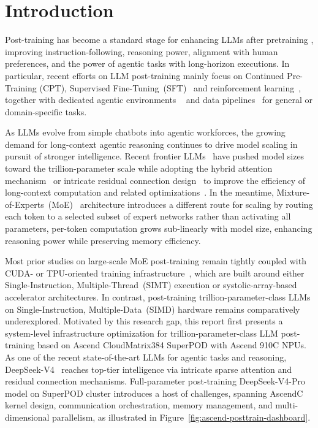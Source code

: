 \clearpage
\section{Introduction}
\label{sec:introduction}

Post-training has become a standard stage for enhancing LLMs after pretraining \citep{lai2025survey, cheng2025empowering}, improving instruction-following, reasoning power, alignment with human preferences, and the power of agentic tasks with long-horizon executions.
In particular, recent efforts on LLM post-training mainly focus on Continued Pre-Training (CPT), Supervised Fine-Tuning~(SFT)~\citep{mecklenburg2024injecting} and reinforcement learning~\citep{schulman2017proximal, shao2024deepseekmath,li2026rethinking}, together with dedicated agentic environments ~\citep{glm5team2026glm5vibecodingagentic,dong2026agent} and data pipelines~\citep{nvidia2026nemotron3superopen} for general or domain-specific tasks. 


As LLMs evolve from simple chatbots into agentic workforces, the growing demand for long-context agentic reasoning continues to drive model scaling in pursuit of stronger intelligence. Recent frontier LLMs~\citep{deepseekai2025deepseekv3technicalreport, glm5team2026glm5vibecodingagentic} have pushed model sizes toward the trillion-parameter scale while adopting the hybrid attention mechanism~\citep{yang2025gated,dao2024transformers} or intricate residual connection design~\citep{mhc2025} to improve the efficiency of long-context computation and related optimizations~\citep{chen-etal-2026-dynamic-long, li-etal-2026-lycheecluster}. 
In the meantime, Mixture-of-Experts~(MoE)~\citep{fedus2022switch} architecture introduces a different route for scaling by routing each token to a selected subset of expert networks rather than activating all parameters, per-token computation grows sub-linearly with model size, enhancing reasoning power while preserving memory efficiency.

Most prior studies on large-scale MoE post-training remain tightly coupled with CUDA- or TPU-oriented training infrastructure~\citep{deepseekai2025deepseekv3technicalreport,kimiteam2026kimik2openagentic,glm5team2026glm5vibecodingagentic}, which are built around either Single-Instruction, Multiple-Thread~(SIMT) execution or systolic-array-based accelerator architectures. 
In contrast, post-training trillion-parameter-class LLMs on Single-Instruction, Multiple-Data~(SIMD) hardware remains comparatively underexplored. 
Motivated by this research gap, this report first presents a system-level infrastructure optimization for trillion-parameter-class LLM post-training based on Ascend CloudMatrix384 SuperPOD with Ascend 910C NPUs. 
As one of the recent state-of-the-art LLMs for agentic tasks and reasoning, DeepSeek-V4~\citep{deepseekai2026deepseekv4highlyefficientmilliontoken} reaches top-tier intelligence via intricate sparse attention and residual connection mechanisms. Full-parameter post-training DeepSeek-V4-Pro model on SuperPOD cluster introduces a host of challenges, spanning AscendC kernel design, communication orchestration, memory management, and multi-dimensional parallelism, as illustrated in Figure~\ref{fig:ascend-posttrain-dashboard}.  

